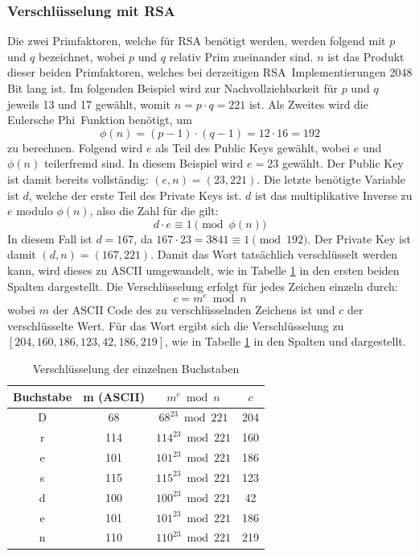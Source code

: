 \subsubsection{Verschlüsselung mit RSA}
Die zwei Primfaktoren, welche für RSA benötigt werden, 
werden folgend mit $p$ und $q$ bezeichnet, wobei $p$ und $q$ relativ Prim zueinander sind. 
$n$ ist das Produkt dieser beiden Primfaktoren, welches bei derzeitigen RSA\textendash\ Implementierungen 
2048 Bit lang ist. Im folgenden Beispiel wird zur Nachvollziehbarkeit für $p$ und $q$ jeweils 13 und 17 gewählt, womit
$n = p \cdot q = 221$ ist. Als Zweites wird die Eulersche Phi\textendash\ Funktion benötigt, um 
\[
\phi(n) = (p-1) \cdot (q-1) = 12 \cdot 16 = 192
\]
zu berechnen. Folgend wird $e$ als Teil des Public Keys gewählt, wobei $e$ und $\phi(n)$ teilerfremd sind. In diesem 
Beispiel wird $e = 23$ gewählt. Der Public Key ist damit bereits vollständig: $(e, n) = (23, 221)$. Die letzte benötigte
Variable ist $d$, welche der erste Teil des Private Keys ist. $d$ ist das multiplikative Inverse zu $e$ modulo $\phi(n)$,
also die Zahl für die gilt:
\[
d \cdot e \equiv 1 \pmod{\phi(n)}
\]
In diesem Fall ist $d = 167$, da $167 \cdot 23 = 3841 \equiv 1 \pmod{192}$. Der Private Key ist damit $(d, n) = (167, 221)$.
Damit das Wort  tatsächlich verschlüsselt werden kann, wird dieses zu ASCII umgewandelt, wie in 
Tabelle \ref{tab:encryption_dresden} in den ersten beiden Spalten dargestellt.
Die Verschlüsselung erfolgt für jedes Zeichen einzeln durch:
\[
c = m^e \bmod n
\]
wobei $m$ der ASCII Code des zu verschlüsselnden Zeichens ist und $c$ der verschlüsselte Wert.
Für das Wort  ergibt sich die Verschlüsselung zu $[204, 160, 186, 123, 42, 186, 219]$, wie in Tabelle
\ref{tab:encryption_dresden} in den Spalten   und  dargestellt.
\begin{table}[h]
    \centering
    \begin{tabular}{|c|c|c|c|}
        \hline
        Buchstabe & m (ASCII) & $m^e \bmod n$ & $c$ \\
        \hline
        D & 68 & $68^{23} \bmod 221$ & 204 \\
        r & 114 & $114^{23} \bmod 221$ & 160 \\
        e & 101 & $101^{23} \bmod 221$ & 186 \\
        s & 115 & $115^{23} \bmod 221$ & 123 \\
        d & 100 & $100^{23} \bmod 221$ & 42 \\
        e & 101 & $101^{23} \bmod 221$ & 186 \\
        n & 110 & $110^{23} \bmod 221$ & 219 \\
        \hline
    \end{tabular}
    \caption{Verschlüsselung der einzelnen Buchstaben}
    \label{tab:encryption_dresden}
\end{table}


